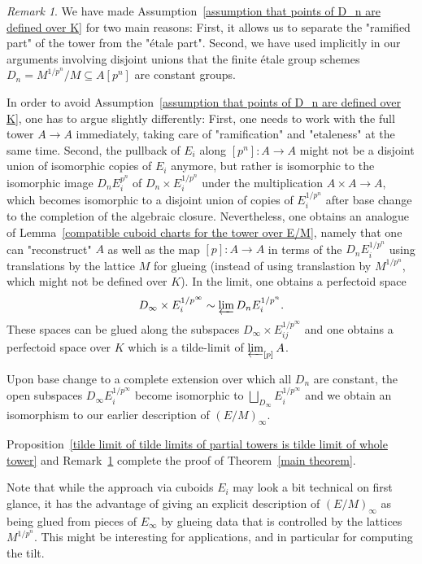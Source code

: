 \documentclass[11pt,oneside]{amsart}
\theoremstyle{definition}
\theoremstyle{remark}
\newtheorem{remark}[theorem]{Remark}
\begin{document}
	\begin{remark}\label{remark: the case of general perfectoid fields K}
		We have made Assumption~\ref{assumption that points of D_n are defined over K} for two main reasons: First, it allows us to separate the "ramified part" of the tower from the "\'etale part". Second, we have used implicitly in our arguments involving disjoint unions that the finite \'etale group schemes $D_n = M^{1/p^n}/M \subseteq A[p^n]$ are constant groups. 
		
		In order to avoid Assumption~\ref{assumption that points of D_n are defined over K}, one has to argue slightly differently: First, one needs to work with the full tower $A\rightarrow A$ immediately, taking care of "ramification" and "etaleness" at the same time. Second, the pullback of $E_i$ along $[p^n]:A\rightarrow A$ might not be a disjoint union of isomorphic copies of $E_i$ anymore, but rather is isomorphic to the isomorphic image $D_nE_i^{p^n}$ of $D_n \times E_i^{1/p^n}$ under the multiplication $A\times A\rightarrow A$, which becomes isomorphic to a disjoint union of copies of $E_i^{1/p^n}$ after base change to the completion of the algebraic closure. Nevertheless, one obtains an analogue of Lemma~\ref{compatible cuboid charts for the tower over E/M}, namely that one can "reconstruct" $A$ as well as the map $[p]:A\rightarrow A$ in terms of the $D_nE_i^{1/p^n}$ using translations by the lattice $M$ for glueing (instead of using translastion by $M^{1/p^n}$, which might not be defined over $K$).
		In the limit, one obtains a perfectoid space 
		\[D_\infty \times E_i^{1/p^\infty} \sim \varprojlim D_nE_i^{1/p^n}.\]
		These spaces can be glued along the subspaces $D_\infty \times E_{ij}^{1/p^\infty}$ and one obtains a perfectoid space over $K$ which is a tilde-limit of $\varprojlim_{[p]} A$.
		
		Upon base change to a complete extension over which all $D_n$ are constant, the open subspaces $D_\infty E_i^{1/p^\infty}$ become isomorphic to $\bigsqcup_{D_\infty} E_i^{1/p^\infty}$ and we obtain an isomorphism to our earlier description of $(E/M)_\infty$.
	\end{remark}
	
	Proposition~\ref{tilde limit of tilde limits of partial towers is tilde limit of whole tower} and Remark~\ref{remark: the case of general perfectoid fields K} complete the proof of Theorem~\ref{main theorem}.
	
	Note that while the approach via cuboids $E_i$ may look a bit technical on first glance, it has the advantage of giving an explicit description of $(E/M)_\infty$ as being glued from pieces of $E_\infty$ by glueing data that is controlled by the lattices $M^{1/p^n}$. This might be interesting for applications, and in particular for computing the tilt. 
	
\end{document}
